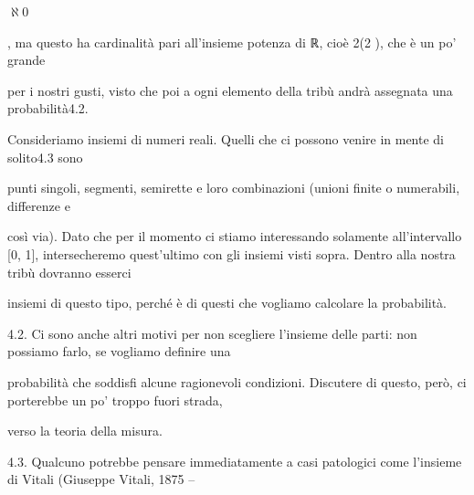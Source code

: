 \documentclass[a4paper,portrait,12pt]{article}
\begin{document}
\begin{flushleft}
$\aleph$0
\end{flushleft}


\begin{flushleft}
[0, 1], ma questo ha cardinalit\`{a} pari all'insieme potenza di ℝ, cio\`{e} 2(2 ), che \`{e} un po' grande
\end{flushleft}


\begin{flushleft}
per i nostri gusti, visto che poi a ogni elemento della tribù andr\`{a} assegnata una probabilit\`{a}4.2.
\end{flushleft}


\begin{flushleft}
Consideriamo insiemi di numeri reali. Quelli che ci possono venire in mente di solito4.3 sono
\end{flushleft}


\begin{flushleft}
punti singoli, segmenti, semirette e loro combinazioni (unioni finite o numerabili, differenze e
\end{flushleft}


\begin{flushleft}
così via). Dato che per il momento ci stiamo interessando solamente all'intervallo [0, 1], intersecheremo quest'ultimo con gli insiemi visti sopra. Dentro alla nostra tribù dovranno esserci
\end{flushleft}


\begin{flushleft}
insiemi di questo tipo, perch\'{e} \`{e} di questi che vogliamo calcolare la probabilit\`{a}.
\end{flushleft}


\begin{flushleft}
4.2. Ci sono anche altri motivi per non scegliere l'insieme delle parti: non possiamo farlo, se vogliamo definire una
\end{flushleft}


\begin{flushleft}
probabilit\`{a} che soddisfi alcune ragionevoli condizioni. Discutere di questo, per\`{o}, ci porterebbe un po' troppo fuori strada,
\end{flushleft}


\begin{flushleft}
verso la teoria della misura.
\end{flushleft}


\begin{flushleft}
4.3. Qualcuno potrebbe pensare immediatamente a casi patologici come l'insieme di Vitali (Giuseppe Vitali, 1875 --
\end{flushleft}
\end{document}
